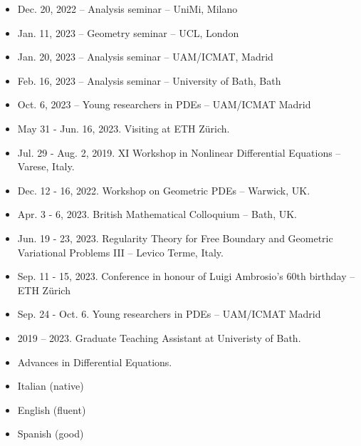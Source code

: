 \documentclass[12pt]{amsart}
\begin{document}
\bigskip\medskip
{}
\begin{itemize}
	\item {Dec. 20, 2022} -- Analysis seminar -- UniMi, Milano
	\item {Jan. 11, 2023} -- Geometry seminar -- UCL, London
	\item {Jan. 20, 2023} -- Analysis seminar -- UAM/ICMAT, Madrid 
	\item {Feb. 16, 2023} -- Analysis seminar -- University of Bath, Bath
	\item {Oct. 6, 2023} -- Young researchers in PDEs -- UAM/ICMAT Madrid
\end{itemize}

\bigskip\medskip
{}
\begin{itemize}
	\item {May 31 - Jun. 16, 2023.} Visiting at ETH Z\"urich.
\end{itemize}

\bigskip\medskip
{}
\begin{itemize}
	\item {Jul. 29 - Aug. 2, 2019}. XI Workshop in Nonlinear	 Differential Equations -- Varese, Italy. 
	\item {Dec. 12 - 16, 2022}. Workshop on Geometric PDEs -- Warwick, UK. 
	\item {Apr. 3 - 6, 2023}. British Mathematical Colloquium -- Bath, UK.
	\item {Jun. 19 - 23, 2023}. Regularity Theory for Free Boundary and Geometric Variational Problems III -- Levico Terme, Italy.
	\item {Sep. 11 - 15, 2023}. Conference in honour of Luigi Ambrosio's 60th birthday -- ETH Z\"urich
	\item {Sep. 24 - Oct. 6}. Young researchers in PDEs -- UAM/ICMAT Madrid
\end{itemize}

\bigskip\medskip\newpage
{}
\begin{itemize}
	\item 2019 -- 2023. Graduate Teaching Assistant at Univeristy of Bath. 
\end{itemize}

\bigskip\medskip
{}
\begin{itemize}
	\item Advances in Differential Equations.
\end{itemize}

\bigskip\medskip
{}
\begin{itemize}
	\item Italian (native)
	\item English (fluent)
	\item Spanish (good) 
\end{itemize}
\end{document}
